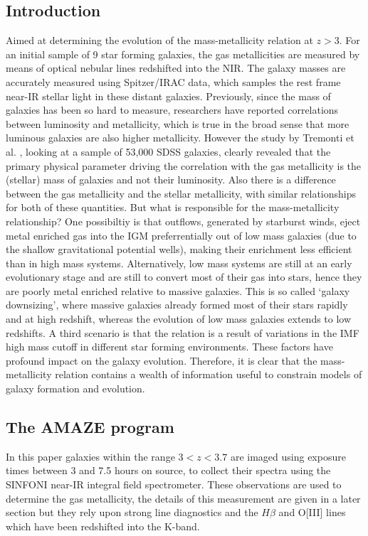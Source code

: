 \documentclass{literature}
\begin{document}
\subsection{Introduction}
\citep{Maiolino2008} Aimed at determining the evolution of the mass-metallicity relation at $z > 3$. For an initial sample of 9 star forming galaxies, the gas metallicities are measured by means of optical nebular lines redshifted into the NIR. The galaxy masses are accurately measured using Spitzer/IRAC data, which samples the rest frame near-IR stellar light in these distant galaxies. Previously, since the mass of galaxies has been so hard to measure, researchers have reported correlations between luminosity and metallicity, which is true in the broad sense that more luminous galaxies are also higher metallicity. However the study by Tremonti et al. \citep{Tremonti2004}, looking at a sample of 53,000 SDSS galaxies, clearly revealed that the primary physical parameter driving the correlation with the gas metallicity is the (stellar) mass of galaxies and not their luminosity. Also there is a difference between the gas metallicity and the stellar metallicity, with similar relationships for both of these quantities. But what is responsible for the mass-metallicity relationship? One possibiltiy is that outflows, generated by starburst winds, eject metal enriched gas into the IGM preferrentially out of low mass galaxies (due to the shallow gravitational potential wells), making their enrichment less efficient than in high mass systems. Alternatively, low mass systems are still at an early evolutionary stage and are still to convert most of their gas into stars, hence they are poorly metal enriched relative to massive galaxies. This is so called `galaxy downsizing', where massive galaxies already formed most of their stars rapidly and at high redshift, whereas the evolution of low mass galaxies extends to low redshifts. A third scenario is that the relation is a result of variations in the IMF high mass cutoff in different star forming environments. These factors have profound impact on the galaxy evolution. Therefore, it is clear that the mass-metallicity relation contains a wealth of information useful to constrain models of galaxy formation and evolution. 
\subsection{The AMAZE program}
In this paper galaxies within the range $3 < z < 3.7$ are imaged using exposure times between 3 and 7.5 hours on source, to collect their spectra using the SINFONI near-IR integral field spectrometer. These observations are used to determine the gas metallicity, the details of this measurement are given in a later section but they rely upon strong line diagnostics and the $H \beta$ and O[III] lines which have been redshifted into the K-band.
\end{document}
